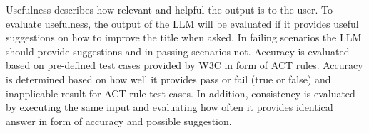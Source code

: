 Usefulness describes how relevant and helpful the output is to the user. To evaluate usefulness, the output of the LLM will be evaluated if it provides useful suggestions on how to improve the title when asked. In failing scenarios the LLM should provide suggestions and in passing scenarios not. Accuracy is evaluated based on pre-defined test cases provided by W3C in form of ACT rules. Accuracy is determined based on how well it provides pass or fail (true or false) and inapplicable result for ACT rule test cases. In addition, consistency is evaluated by executing the same input and evaluating how often it provides identical answer in form of accuracy and possible suggestion. 

